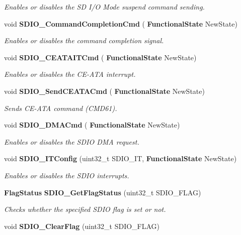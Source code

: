 \begin{DoxyCompactItemize}
\begin{DoxyCompactList}\small\item\em Enables or disables the SD I/O Mode suspend command sending. \end{DoxyCompactList}\item 
void \textbf{ S\+D\+I\+O\+\_\+\+Command\+Completion\+Cmd} (\textbf{ Functional\+State} New\+State)
\begin{DoxyCompactList}\small\item\em Enables or disables the command completion signal. \end{DoxyCompactList}\item 
void \textbf{ S\+D\+I\+O\+\_\+\+C\+E\+A\+T\+A\+I\+T\+Cmd} (\textbf{ Functional\+State} New\+State)
\begin{DoxyCompactList}\small\item\em Enables or disables the C\+E-\/\+A\+TA interrupt. \end{DoxyCompactList}\item 
void \textbf{ S\+D\+I\+O\+\_\+\+Send\+C\+E\+A\+T\+A\+Cmd} (\textbf{ Functional\+State} New\+State)
\begin{DoxyCompactList}\small\item\em Sends C\+E-\/\+A\+TA command (C\+M\+D61). \end{DoxyCompactList}\item 
void \textbf{ S\+D\+I\+O\+\_\+\+D\+M\+A\+Cmd} (\textbf{ Functional\+State} New\+State)
\begin{DoxyCompactList}\small\item\em Enables or disables the S\+D\+IO D\+MA request. \end{DoxyCompactList}\item 
void \textbf{ S\+D\+I\+O\+\_\+\+I\+T\+Config} (uint32\+\_\+t S\+D\+I\+O\+\_\+\+IT, \textbf{ Functional\+State} New\+State)
\begin{DoxyCompactList}\small\item\em Enables or disables the S\+D\+IO interrupts. \end{DoxyCompactList}\item 
\textbf{ Flag\+Status} \textbf{ S\+D\+I\+O\+\_\+\+Get\+Flag\+Status} (uint32\+\_\+t S\+D\+I\+O\+\_\+\+F\+L\+AG)
\begin{DoxyCompactList}\small\item\em Checks whether the specified S\+D\+IO flag is set or not. \end{DoxyCompactList}\item 
void \textbf{ S\+D\+I\+O\+\_\+\+Clear\+Flag} (uint32\+\_\+t S\+D\+I\+O\+\_\+\+F\+L\+AG)

\end{DoxyCompactItemize}
